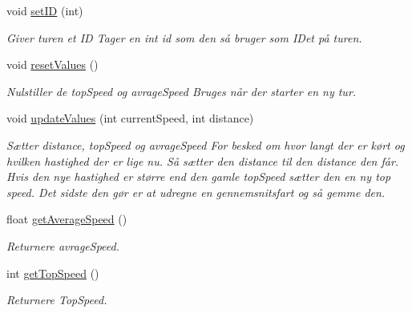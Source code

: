 \begin{DoxyCompactItemize}
void \hyperlink{classRideData_a0290811130a17ab192e4c89068a48df9}{set\+ID} (int)
\begin{DoxyCompactList}\small\item\em Giver turen et ID Tager en int id som den så bruger som ID\textquotesingle{}et på turen. \end{DoxyCompactList}\item 
\mbox{\label{classRideData_aaa4e995f1a17e0a92e7db6dc3cd7bbdb}} 
void \hyperlink{classRideData_aaa4e995f1a17e0a92e7db6dc3cd7bbdb}{reset\+Values} ()
\begin{DoxyCompactList}\small\item\em Nulstiller de top\+Speed og avrage\+Speed Bruges når der starter en ny tur. \end{DoxyCompactList}\item 
void \hyperlink{classRideData_a0b805e6b56d07d574902ca37eed99758}{update\+Values} (int current\+Speed, int distance)
\begin{DoxyCompactList}\small\item\em Sætter distance, top\+Speed og avrage\+Speed For besked om hvor langt der er kørt og hvilken hastighed der er lige nu. Så sætter den distance til den distance den får. Hvis den nye hastighed er større end den gamle top\+Speed sætter den en ny top speed. Det sidste den gør er at udregne en gennemsnitsfart og så gemme den. \end{DoxyCompactList}\item 
\mbox{\label{classRideData_a920d73fd13d8d0f19a66b03221669e13}} 
float \hyperlink{classRideData_a920d73fd13d8d0f19a66b03221669e13}{get\+Average\+Speed} ()
\begin{DoxyCompactList}\small\item\em Returnere avrage\+Speed. \end{DoxyCompactList}\item 
\mbox{\label{classRideData_a695105f79682d98c02d38755744f9750}} 
int \hyperlink{classRideData_a695105f79682d98c02d38755744f9750}{get\+Top\+Speed} ()
\begin{DoxyCompactList}\small\item\em Returnere Top\+Speed. \end{DoxyCompactList}\item 
\mbox{\label{classRideData_af72f4687f32b94d4f2d6e8cd59023b24}} 

\end{DoxyCompactItemize}
